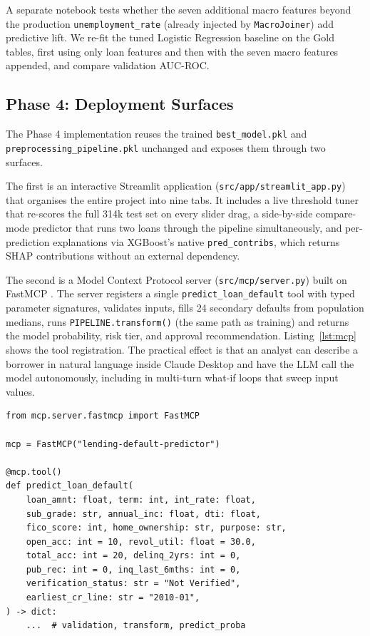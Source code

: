 \documentclass[conference]{IEEEtran}
\begin{document}
A separate notebook tests whether the seven additional macro features beyond
the production \texttt{unemployment\_rate} (already injected by
\texttt{MacroJoiner}) add predictive lift. We re-fit the tuned Logistic
Regression baseline on the Gold tables, first using only loan features and
then with the seven macro features appended, and compare validation AUC-ROC.

\subsection{Phase 4: Deployment Surfaces}

The Phase 4 implementation reuses the trained \texttt{best\_model.pkl} and
\texttt{preprocessing\_pipeline.pkl} unchanged and exposes them through two
surfaces.

The first is an interactive Streamlit \cite{streamlit} application
(\texttt{src/app/streamlit\_app.py}) that organises the entire project into
nine tabs. It includes a live threshold tuner that re-scores the full 314k
test set on every slider drag, a side-by-side compare-mode predictor that
runs two loans through the pipeline simultaneously, and per-prediction
explanations via XGBoost's native \texttt{pred\_contribs}, which returns
SHAP \cite{lundberg2017unified} contributions without an external dependency.

The second is a Model Context Protocol server
(\texttt{src/mcp/server.py}) built on FastMCP \cite{anthropic_mcp}. The
server registers a single \texttt{predict\_loan\_default} tool with typed
parameter signatures, validates inputs, fills 24 secondary defaults from
population medians, runs \texttt{PIPELINE.transform()} (the same path as
training) and returns the model probability, risk tier, and approval
recommendation. Listing~\ref{lst:mcp} shows the tool registration. The
practical effect is that an analyst can describe a borrower in natural
language inside Claude Desktop and have the LLM call the model
autonomously, including in multi-turn what-if loops that sweep input
values.

\begin{lstlisting}[caption={MCP tool registration. Type annotations are required so FastMCP deserialises JSON-RPC arguments before they hit the validation block.},label={lst:mcp}]
from mcp.server.fastmcp import FastMCP

mcp = FastMCP("lending-default-predictor")

@mcp.tool()
def predict_loan_default(
    loan_amnt: float, term: int, int_rate: float,
    sub_grade: str, annual_inc: float, dti: float,
    fico_score: int, home_ownership: str, purpose: str,
    open_acc: int = 10, revol_util: float = 30.0,
    total_acc: int = 20, delinq_2yrs: int = 0,
    pub_rec: int = 0, inq_last_6mths: int = 0,
    verification_status: str = "Not Verified",
    earliest_cr_line: str = "2010-01",
) -> dict:
    ...  # validation, transform, predict_proba
\end{lstlisting}
\end{document}
